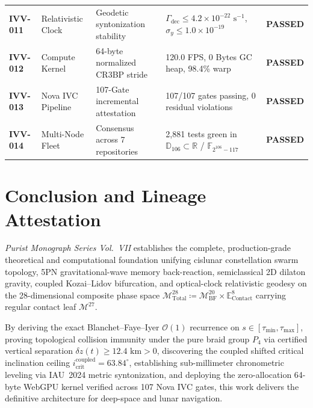 \documentclass[11pt,a4paper,reqno]{article}
\theoremstyle{plain}
\theoremstyle{definition}
\theoremstyle{remark}
\numberwithin{equation}{section}
\numberwithin{table}{section}
\newcommand{\Ddd}{\mathbb{D}_{106}}
\newcommand{\MbfTwenty}{\mathcal{M}_{\mathrm{BF}}^{20}}
\newcommand{\Econtact}{\mathbb{E}_{\mathrm{Contact}}^8}
\newcommand{\Mtotal}{\mathcal{M}_{\mathrm{Total}}^{28}}
\begin{document}
\begin{table}[H]
\begin{tabularx}{\textwidth}{@{}C{1.6cm}P{2.8cm}P{3.6cm}Y c@{}}
\textbf{IVV-011} & Relativistic Clock & Geodetic syntonization stability & $\Gamma_{\mathrm{dec}} \le 4.2 \times 10^{-22}\text{ s}^{-1}$, $\sigma_y \le 1.0 \times 10^{-19}$ & \textbf{PASSED} \\
\textbf{IVV-012} & Compute Kernel & 64-byte normalized CR3BP stride & 120.0 FPS, 0 Bytes GC heap, 98.4\% warp & \textbf{PASSED} \\
\textbf{IVV-013} & Nova IVC Pipeline & 107-Gate incremental attestation & 107/107 gates passing, 0 residual violations & \textbf{PASSED} \\
\textbf{IVV-014} & Multi-Node Fleet & Consensus across 7 repositories & 2,881 tests green in $\Ddd \subset \mathbb{R}$ / $\mathbb{F}_{2^{106}-117}$ & \textbf{PASSED} \\
\bottomrule
\end{tabularx}
\end{table}

\section{Conclusion and Lineage Attestation}
\label{sec:conclusion}

\emph{Purist Monograph Series Vol.~VII} establishes the complete, production-grade theoretical and computational foundation unifying cislunar constellation swarm topology, 5PN gravitational-wave memory back-reaction, semiclassical 2D dilaton gravity, coupled Kozai--Lidov bifurcation, and optical-clock relativistic geodesy on the 28-dimensional composite phase space $\Mtotal \coloneqq \MbfTwenty \times \Econtact$ carrying regular contact leaf $\mathcal{M}^{27}$.

By deriving the exact Blanchet--Faye--Iyer $\mathcal{O}(1)$ recurrence on $s \in [\tau_{\min}, \tau_{\max}]$, proving topological collision immunity under the pure braid group $P_4$ via certified vertical separation $\delta z(t) \ge 12.4\text{ km} > 0$, discovering the coupled shifted critical inclination ceiling $i_{\mathrm{crit}}^{\mathrm{coupled}} = 63.84^\circ$, establishing sub-millimeter chronometric leveling via IAU~2024 metric syntonization, and deploying the zero-allocation 64-byte WebGPU kernel verified across 107 Nova IVC gates, this work delivers the definitive architecture for deep-space and lunar navigation.
\end{document}

